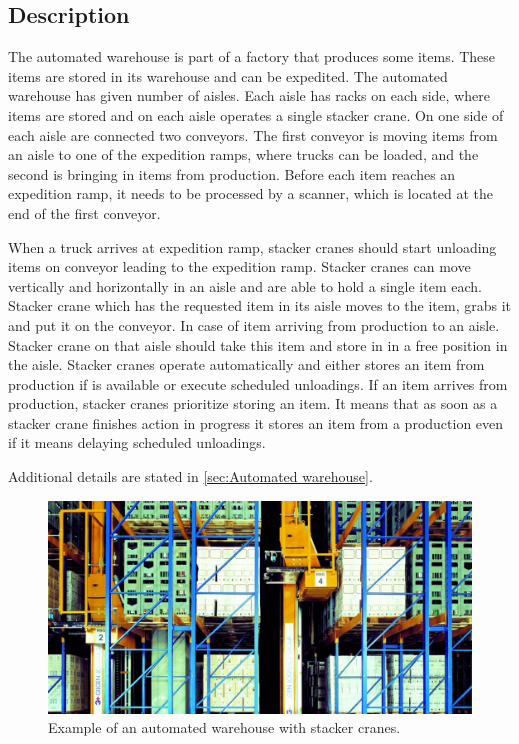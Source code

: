 \documentclass{ctuthesis}
\begin{document}
\subsection{Description}
\label{subsec:Description}
The automated warehouse is part of a factory that produces some items. These items are stored in its warehouse and can be expedited. The automated warehouse has given number of aisles. Each aisle has racks on each side, where items are stored and on each aisle operates a single stacker crane. On one side of each aisle are connected two conveyors. The first conveyor is moving items from an aisle to one of the expedition ramps, where trucks can be loaded, and the second is bringing in items from production. Before each item reaches an expedition ramp, it needs to be processed by a scanner, which is located at the end of the first conveyor.

When a truck arrives at expedition ramp, stacker cranes should start unloading items on conveyor leading to the expedition ramp. Stacker cranes can move vertically and horizontally in an aisle and are able to hold a single item each. Stacker crane which has the requested item in its aisle moves to the item, grabs it and put it on the conveyor. In case of item arriving from production to an aisle. Stacker crane on that aisle should take this item and store in in a free position in the aisle. Stacker cranes operate automatically and either stores an item from production if is available or execute scheduled unloadings. If an item arrives from production, stacker cranes prioritize storing an item. It means that as soon as a stacker crane finishes action in progress it stores an item from a production even if it means delaying scheduled unloadings.

Additional details are stated in \ref{sec:Automated warehouse}.

\begin{figure}
\includegraphics[width=0.8\linewidth]{highbaywarehouse.jpg}
\caption{Example of an automated warehouse with stacker cranes. \cite{warehousepic}}
\label{fig:foobar}
\end{figure}
\end{document}
